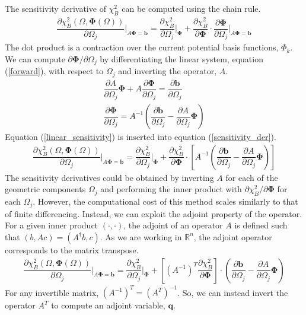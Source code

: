 \documentclass[aps,unsortedaddress]{revtex4-1}
\newcommand{\partder}[2]{\dfrac{\partial  #1}{\partial  #2}}
\begin{document}
The sensitivity derivative of $\chi^2_B$ can be computed using the chain rule. 
\begin{gather}
\partder{\chi^2_B(\Omega, \bm{\Phi}(\Omega))}{\Omega_j} \bigg \rvert_{A \bm{\Phi} = \bm{b}} = \partder{\chi^2_B}{\Omega_j} \bigg \rvert_{\bm{\Phi}} + \partder{\chi^2_B}{\bm{\Phi}} \cdot \partder{\bm{\Phi}}{\Omega_j} \bigg \rvert_{A \bm{\Phi} = \bm{b}}
\label{sensitivity_der}
\end{gather}
The dot product is a contraction over the current potential basis functions, $\Phi_k$. We can compute $\partial \bm{\Phi}/ \partial \Omega_j$ by differentiating the linear system, equation (\ref{forward}), with respect to $\Omega_j$ and inverting the operator, $A$.
\begin{gather}
\partder{A}{\Omega_j} \bm{\Phi} + A \partder{\bm{\Phi}}{\Omega_j} = \partder{\bm{b}}{\Omega_j} \\
\partder{\bm{\Phi}}{\Omega_j} = A^{-1} \left( \partder{\bm{b}}{\Omega_j} - \partder{A}{\Omega_j} \bm{\Phi} \right) 
\label{linear_sensitivity}
\end{gather}
Equation (\ref{linear_sensitivity}) is inserted into equation (\ref{sensitivity_der}).
\begin{gather}
\partder{\chi^2_B(\Omega, \bm{\Phi}(\Omega))}{\Omega_j} \bigg \rvert_{A \bm{\Phi} = \bm{b}} = \partder{\chi^2_B}{\Omega_j} \bigg \rvert_{\bm{\Phi}} + \partder{\chi^2_B}{\bm{\Phi}} \cdot \left[ A^{-1} \left( \partder{\bm{b}}{\Omega_j} - \partder{A}{\Omega_j} \bm{\Phi} \right) \right] 
\end{gather}
The sensitivity derivatives could be obtained by inverting $A$ for each of the geometric components $\Omega_j$ and performing the inner product with $\partial \chi^2_B/ \partial \bm{\Phi}$ for each $\Omega_j$. However, the computational cost of this method scales similarly to that of finite differencing. Instead, we can exploit the adjoint property of the operator. For a given inner product $(\cdot,\cdot)$, the adjoint of an operator $A$ is defined such that $(b,Ac) = (A^{\dagger} b, c)$. As we are working in $\mathbb{R}^n$, the adjoint operator corresponds to the matrix transpose. 
\begin{gather}
\partder{\chi^2_B(\Omega, \bm{\Phi}(\Omega))}{\Omega_j} \bigg \rvert_{A \bm{\Phi} = \bm{b}} = \partder{\chi^2_B}{\Omega_j} \bigg \rvert_{\bm{\Phi}} + \left[ \left(A^{-1}\right)^{T} \partder{\chi^2_B}{\bm{\Phi}}\right] \cdot \left( \partder{\bm{b}}{\Omega_j} - \partder{A}{\Omega_j} \bm{\Phi} \right)
\end{gather}
For any invertible matrix, $\left( A^{-1} \right)^T = \left( A^{T} \right)^{-1}$. So, we can instead invert the operator $A^T$ to compute an adjoint variable, $\bm{q}$.
\end{document}
